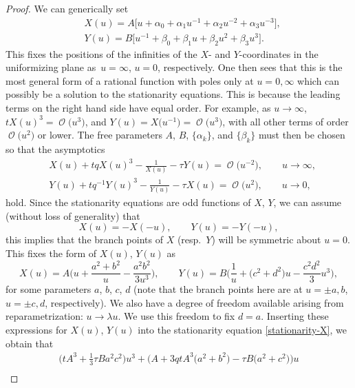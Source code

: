 \documentclass[pdftex]{sigma}
\DeclareMathOperator{\OO}{\mathcal{O}}
\numberwithin{equation}{section}
\begin{document}
\begin{proof}
 We can generically set
 \begin{align*}
 &X(u) = A \bigl[ u + \alpha_0 + \alpha_1 u^{-1} + \alpha_2 u^{-2} + \alpha_3 u^{-3}\bigr],\\
 &Y(u) = B \bigl[ u^{-1} + \beta_0 + \beta_1 u + \beta_2 u^{2} + \beta_3 u^{3}\bigr].
 \end{align*}
This fixes the positions of the infinities of the $X$- and $Y$-coordinates in the uniformizing plane as~$u=\infty$, $u=0$, respectively.
One then sees that this is the most general form of a rational function with poles only at $u=0,\infty$ which can possibly be a solution to the stationarity equations. This is because the leading terms on the right hand side have equal order. For example, as $u\to \infty$, $tX(u)^3 = \OO\bigl(u^3\bigr)$, and $Y(u) = X\bigl(u^{-1}\bigr) = \OO\bigl(u^{3}\bigr)$, with all other terms of order $\OO\bigl(u^2\bigr)$ or lower. The free parameters $A$, $B$, $\{\alpha_k\}$,
and $\{\beta_k\}$ must then be chosen so that the asymptotics
 \begin{align*}
 &X(u) + tqX(u)^3 - \frac{1}{X(u)} - \tau Y(u) = \OO\bigl(u^{-2}\bigr),\qquad u\to \infty,\\
 &Y(u) + tq^{-1}Y(u)^3 - \frac{1}{Y(u)} - \tau X(u) = \OO\bigl(u^{2}\bigr),\qquad u \to 0,
 \end{align*}
hold. Since the stationarity equations are odd functions of $X$, $Y$, we can assume (without loss of generality) that
 \begin{equation*}
 X(u) = -X(-u), \qquad Y(u) = -Y(-u),
 \end{equation*}
this implies that the branch points of $X$ (resp.\ $Y$) will be symmetric about $u=0$. This fixes the form of $X(u)$, $Y(u)$ as
 \begin{equation*}
 X(u) = A\biggl(u + \frac{a^2+b^2}{u} -\frac{a^2b^2}{3u^3}\biggr),\qquad Y(u) = B\biggl(\frac{1}{u} + \bigl(c^2+d^2\bigr)u -\frac{c^2d^2}{3}u^3\biggr),
 \end{equation*}
for some parameters $a$, $b$, $c$, $d$ (note that the branch points here are at $u=\pm a,b$, $u=\pm c,d$, respectively). We also have a degree of freedom available arising from reparametrization: ${u\to \lambda u}$. We use this freedom to fix $d=a$. Inserting these expressions for $X(u)$, $Y(u)$ into the stationarity equation \eqref{stationarity-X}, we obtain that
 \begin{gather*}
 \biggl(tA^3 +\frac{1}{3}\tau Ba^2c^2\biggr) u^3 + \bigl(A + 3 q tA^3\bigl(a^2+b^2\bigr) - \tau B \bigl(a^2+c^2\bigr)\bigr) u \\

\end{gather*}
\end{proof}
\end{document}
